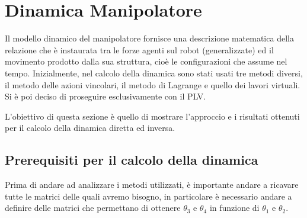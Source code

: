 \section{Dinamica Manipolatore}
Il modello dinamico del manipolatore fornisce una descrizione matematica della relazione che è instaurata tra le forze agenti sul robot (generalizzate) ed il movimento prodotto dalla sua struttura, cioè le configurazioni che assume nel tempo. Inizialmente, nel calcolo della dinamica sono stati usati tre metodi diversi, il metodo delle azioni vincolari, il metodo di Lagrange e quello dei lavori virtuali. Si è poi deciso di proseguire esclusivamente con il PLV. \par L'obiettivo di questa sezione è quello di mostrare l'approccio e i risultati ottenuti per il calcolo della dinamica diretta ed inversa.
\subsection{Prerequisiti per il calcolo della dinamica}\label{sec:prerequisiti-dinamica}
Prima di andare ad analizzare i metodi utilizzati, è importante andare a ricavare tutte le matrici delle quali avremo bisogno, in particolare è necessario andare a definire delle matrici che permettano di ottenere $\theta_3$ e $\theta_4$ in funzione di $\theta_1$ e $\theta_2$.

